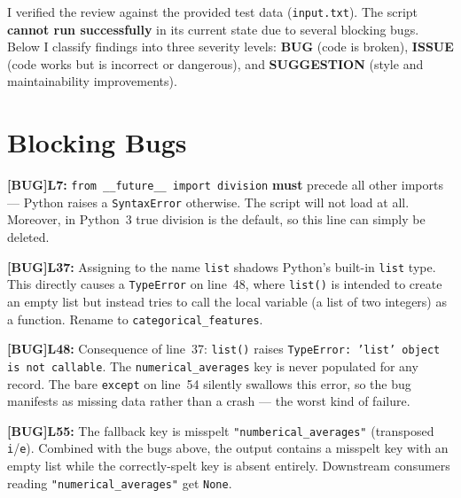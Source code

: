 \documentclass{article}
\newcommand{\lineno}[1]{\textbf{L#1:} }
\newcommand{\bug}{\textcolor{red!70!black}{\textbf{[BUG]}}\space}
\begin{document}
I verified the review against the provided test data (\texttt{input.txt}). The script \textbf{cannot run successfully} in its current state due to several blocking bugs. Below I classify findings into three severity levels: \textcolor{red!70!black}{\textbf{BUG}} (code is broken), \textcolor{orange!80!black}{\textbf{ISSUE}} (code works but is incorrect or dangerous), and \textcolor{suggblue}{\textbf{SUGGESTION}} (style and maintainability improvements).

\section{Blocking Bugs}

\begin{bugbox}
\bug \lineno{7} \texttt{from \_\_future\_\_ import division} \textbf{must} precede all other imports --- Python raises a \texttt{SyntaxError} otherwise. The script will not load at all. Moreover, in Python~3 true division is the default, so this line can simply be deleted.
\end{bugbox}

\begin{bugbox}
\bug \lineno{37} Assigning to the name \texttt{list} shadows Python's built-in \texttt{list} type. This directly causes a \texttt{TypeError} on line~48, where \texttt{list()} is intended to create an empty list but instead tries to call the local variable (a list of two integers) as a function. Rename to \texttt{categorical\_features}.
\end{bugbox}

\begin{bugbox}
\bug \lineno{48} Consequence of line~37: \texttt{list()} raises \texttt{TypeError: 'list' object is not callable}. The \texttt{numerical\_averages} key is never populated for any record. The bare \texttt{except} on line~54 silently swallows this error, so the bug manifests as missing data rather than a crash --- the worst kind of failure.
\end{bugbox}

\begin{bugbox}
\bug \lineno{55} The fallback key is misspelt \texttt{"numberical\_averages"} (transposed \texttt{i}/\texttt{e}). Combined with the bugs above, the output contains a misspelt key with an empty list while the correctly-spelt key is absent entirely. Downstream consumers reading \texttt{"numerical\_averages"} get \texttt{None}.
\end{bugbox}
\end{document}
